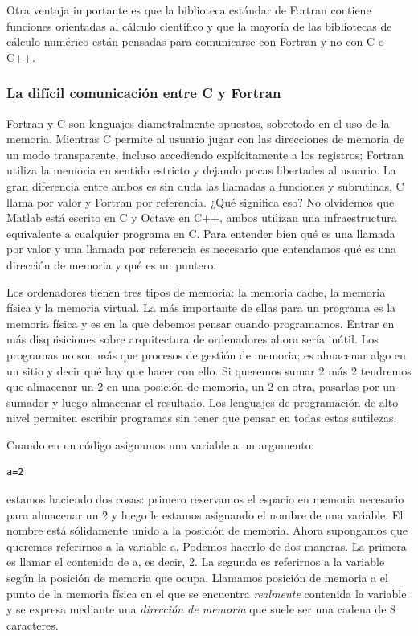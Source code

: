 Otra ventaja importante es que la biblioteca estándar de Fortran
contiene funciones orientadas al cálculo científico y que la mayoría
de las bibliotecas de cálculo numérico están pensadas para comunicarse
con Fortran y no con C o C++.


\subsubsection{La difícil comunicación entre C y Fortran}
\label{sec:comunica-c-fort}
Fortran y C son lenguajes diametralmente opuestos, sobretodo en el uso
de la memoria. Mientras C permite al usuario jugar con las direcciones
de memoria de un modo transparente, incluso accediendo explícitamente
a los registros; Fortran utiliza la memoria en sentido estricto y
dejando pocas libertades al usuario. La gran diferencia entre ambos es
sin duda las llamadas a funciones y subrutinas, C llama por valor y
Fortran por referencia. ¿Qué significa eso? No olvidemos que Matlab
está escrito en C y Octave en C++, ambos utilizan una infraestructura
equivalente a cualquier programa en C. Para entender bien qué es una
llamada por valor y una llamada por referencia es necesario que
entendamos qué es una dirección de memoria y qué es un puntero.

Los ordenadores tienen tres tipos de memoria: la memoria cache, la
memoria física y la memoria virtual. La más importante de ellas para
un programa es la memoria física y es en la que debemos pensar cuando
programamos. Entrar en más disquisiciones sobre arquitectura de
ordenadores ahora sería inútil. Los programas no son más que procesos
de gestión de memoria; es almacenar algo en un sitio y decir qué hay
que hacer con ello. Si queremos sumar 2 más 2 tendremos que almacenar
un 2 en una posición de memoria, un 2 en otra, pasarlas por un sumador
y luego almacenar el resultado. Los lenguajes de programación de alto
nivel permiten escribir programas sin tener que pensar en todas estas
sutilezas.

Cuando en un código asignamos una variable a un argumento:

\begin{verbatim}
a=2
\end{verbatim}

estamos haciendo dos cosas: primero reservamos el espacio en memoria
necesario para almacenar un 2 y luego le estamos asignando el nombre
de una variable. El nombre está sólidamente unido a la posición de
memoria. Ahora supongamos que queremos referirnos a la variable a.
Podemos hacerlo de dos maneras. La primera es llamar el contenido de
a, es decir, 2. La segunda es referirnos a la variable según la
posición de memoria que ocupa. Llamamos posición de memoria a el punto
de la memoria física en el que se encuentra \emph{realmente} contenida
la variable y se expresa mediante una \emph{dirección de memoria} que
suele ser una cadena de 8 caracteres.

